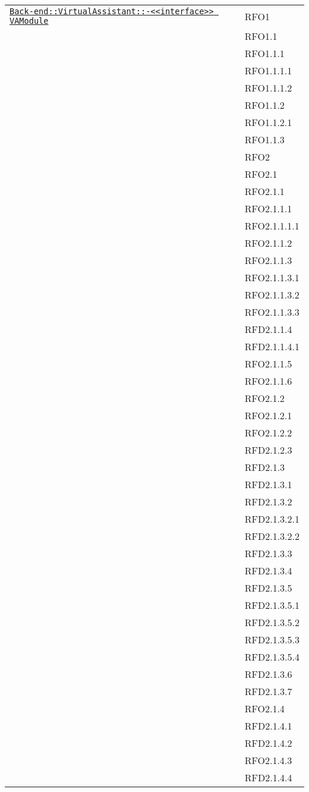 \begin{longtable}{|>{\centering}m{10cm}|m{3cm}<{\centering}|}
\hyperref[Back-end::VirtualAssistant::<<interface>> VAModule]{\texttt{Back-end::VirtualAssistant::-\linebreak <<interface>> VAModule}} & RFO1\\
& RFO1.1\\
& RFO1.1.1\\
& RFO1.1.1.1\\
& RFO1.1.1.2\\
& RFO1.1.2\\
& RFO1.1.2.1\\
& RFO1.1.3\\
& RFO2\\
& RFO2.1\\
& RFO2.1.1\\
& RFO2.1.1.1\\
& RFO2.1.1.1.1\\
& RFO2.1.1.2\\
& RFO2.1.1.3\\
& RFO2.1.1.3.1\\
& RFO2.1.1.3.2\\
& RFO2.1.1.3.3\\
& RFD2.1.1.4\\
& RFD2.1.1.4.1\\
& RFO2.1.1.5\\
& RFO2.1.1.6\\
& RFO2.1.2\\
& RFO2.1.2.1\\
& RFO2.1.2.2\\
& RFD2.1.2.3\\
& RFD2.1.3\\
& RFD2.1.3.1\\
& RFD2.1.3.2\\
& RFD2.1.3.2.1\\
& RFD2.1.3.2.2\\
& RFD2.1.3.3\\
& RFD2.1.3.4\\
& RFD2.1.3.5\\
& RFD2.1.3.5.1\\
& RFD2.1.3.5.2\\
& RFD2.1.3.5.3\\
& RFD2.1.3.5.4\\
& RFD2.1.3.6\\
& RFD2.1.3.7\\
& RFO2.1.4\\
& RFD2.1.4.1\\
& RFD2.1.4.2\\
& RFO2.1.4.3\\
& RFD2.1.4.4\\

\end{longtable}
